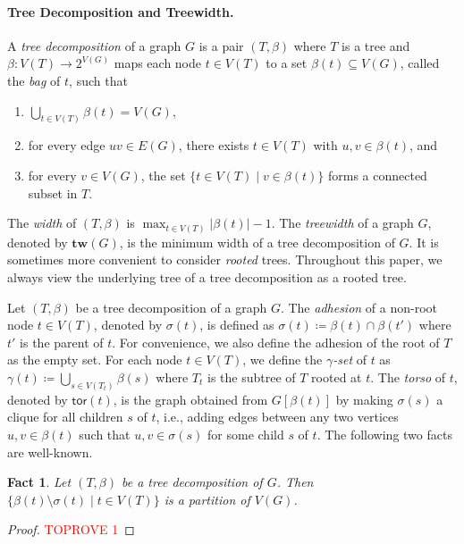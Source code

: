 \documentclass[a4paper,11pt]{article}
\numberwithin{lemma}{section}
\newtheorem{fact}[lemma]{Fact}
\newcommand{\tw}{\mathbf{tw}}
\newcommand{\tor}{\mathsf{tor}}
\begin{document}
\paragraph{Tree Decomposition and Treewidth.}
A \emph{tree decomposition} of a graph $G$ is a pair $(T,\beta)$ where $T$ is a tree and $\beta\colon V(T) \to 2^{V(G)}$ maps each node $t \in V(T)$ to a set $\beta(t) \subseteq V(G)$, called the \emph{bag} of $t$, such that
\begin{enumerate}[label = (\roman*)]
 \item $\bigcup_{t \in V(T)} \beta(t) = V(G)$,
 \item for every edge $uv \in E(G)$, there exists $t \in V(T)$ with $u,v \in \beta(t)$, and
 \item for every $v \in V(G)$, the set $\{t \in V(T) \mid v \in \beta(t)\}$ forms a connected subset in $T$.
\end{enumerate}
The \emph{width} of $(T,\beta)$ is $\max_{t \in V(T)} |\beta(t)| - 1$.
The \emph{treewidth} of a graph $G$, denoted by $\tw(G)$, is the minimum width of a tree decomposition of $G$.
It is sometimes more convenient to consider \emph{rooted} trees.
Throughout this paper, we always view the underlying tree of a tree decomposition as a rooted tree.

Let $(T,\beta)$ be a tree decomposition of a graph $G$.
The \emph{adhesion} of a non-root node $t \in V(T)$, denoted by $\sigma(t)$, is defined as $\sigma(t) \coloneqq \beta(t) \cap \beta(t')$ where $t'$ is the parent of $t$.
For convenience, we also define the adhesion of the root of $T$ as the empty set.
For each node $t \in V(T)$, we define the \emph{$\gamma$-set} of $t$ as $\gamma(t) \coloneqq \bigcup_{s \in V(T_t)} \beta(s)$ where $T_t$ is the subtree of $T$ rooted at $t$.
The \emph{torso} of $t$, denoted by $\tor(t)$, is the graph obtained from $G[\beta(t)]$ by making $\sigma(s)$ a clique for all children $s$ of $t$, i.e., adding edges between any two vertices $u,v \in \beta(t)$ such that $u,v \in \sigma(s)$ for some child $s$ of $t$.
The following two facts are well-known.

\begin{fact}\label{fact-partition}
 Let $(T,\beta)$ be a tree decomposition of $G$.
 Then $\{\beta(t) \setminus \sigma(t) \mid t \in V(T)\}$ is a partition of $V(G)$.
\end{fact}

\begin{proof}\textcolor{red}{TOPROVE 1}\end{proof}
\end{document}
